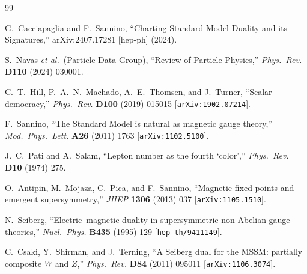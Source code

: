 \documentclass[11pt,a4paper]{article}
\begin{document}
\begin{thebibliography}{99}

  G.~Cacciapaglia and F.~Sannino,
  ``Charting Standard Model Duality and its Signatures,''
  arXiv:2407.17281 [hep-ph] (2024).

  S.~Navas \textit{et al.}\ (Particle Data Group),
  ``Review of Particle Physics,''
  \textit{Phys.~Rev.} \textbf{D110} (2024) 030001.

  C.~T.~Hill, P.~A.~N.~Machado, A.~E.~Thomsen, and J.~Turner,
  ``Scalar democracy,''
  \textit{Phys.~Rev.} \textbf{D100} (2019) 015015
  [\texttt{arXiv:1902.07214}].

  F.~Sannino,
  ``The Standard Model is natural as magnetic gauge theory,''
  \textit{Mod.~Phys.~Lett.} \textbf{A26} (2011) 1763
  [\texttt{arXiv:1102.5100}].

  J.~C.~Pati and A.~Salam,
  ``Lepton number as the fourth `color',''
  \textit{Phys.~Rev.} \textbf{D10} (1974) 275.

  O.~Antipin, M.~Mojaza, C.~Pica, and F.~Sannino,
  ``Magnetic fixed points and emergent supersymmetry,''
  \textit{JHEP} \textbf{1306} (2013) 037
  [\texttt{arXiv:1105.1510}].

  N.~Seiberg,
  ``Electric--magnetic duality in supersymmetric non-Abelian gauge
  theories,''
  \textit{Nucl.~Phys.} \textbf{B435} (1995) 129
  [\texttt{hep-th/9411149}].

  C.~Csaki, Y.~Shirman, and J.~Terning,
  ``A Seiberg dual for the MSSM: partially composite $W$ and $Z$,''
  \textit{Phys.~Rev.} \textbf{D84} (2011) 095011
  [\texttt{arXiv:1106.3074}].

\end{thebibliography}
\end{document}
